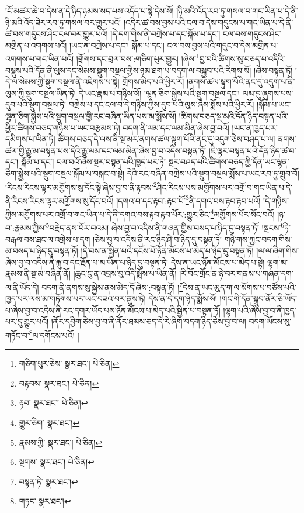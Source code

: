 །ངོ་མཚར་ཆེ་བ་དེས་ན་དེ་ཉིད་ཉམས་སད་པས་འདོད་པ་སྟེ་དེས་སོ། །ཉི་མའི་འོད་རབ་ཏུ་གསལ་བ་གང་ཡིན་པ་དེ་ནི་ཉི་མའི་འོད་ཟེར་རབ་ཏུ་གསལ་བར་གྱུར་པའོ། །འདིར་ཚ་བས་བྱས་པའི་ངལ་བ་དེས་གདུངས་པ་གང་ཡིན་པ་དེ་ནི་ཚ་བས་གདུངས་ཤིང་ངལ་བར་གྱུར་པའོ། །དེ་དག་གིས་ནི་བཀྲེས་པ་དང་སྐོམ་པ་དང་། ངལ་བས་གདུངས་ཤིང་མགྲིན་པ་འགགས་པའོ། །ཡང་ན་བཀྲེས་པ་དང་། སྐོམ་པ་དང་། ངལ་བས་བྱས་པའི་གདུང་བ་དེས་མགྲིན་པ་འགགས་པ་གང་ཡིན་པའོ། །གྲོགས་དང་བྲལ་བས་:གཅིག་པུར་གྱུར། །ཞེས་\footnote{གཅིག་པུར་ཅེས་  སྣར་ཐང་།  པེ་ཅིན། }བྱ་བའི་ཚིགས་སུ་བཅད་པ་འདིའི་བསྡུས་པའི་དོན་ནི་ལུས་དང་སེམས་སྡུག་བསྔལ་གྱིས་ཉམ་ཐག་པ་བདག་ལ་བསྐྱབ་པའི་རིགས་སོ། །ཞེས་བསྟན་ཏོ། །དེ་ལ་སེམས་ཀྱི་སྡུག་བསྔལ་ནི་འཇིགས་པ་སྟེ། གྲོགས་མེད་པའི་ཕྱིར་རོ། །ནགས་ཚལ་སྟུག་པོའི་ནང་དུ་འདུག་པ་ནི་ལུས་ཀྱི་སྡུག་བསྔལ་ཡིན་ཏེ། དེ་ཡང་རྣམ་པ་གཉིས་སོ། །ལྷན་ཅིག་སྐྱེས་པའི་སྡུག་བསྔལ་དང་། ལམ་དུ་ཞུགས་པས་དུབ་པའི་སྡུག་བསྔལ་ཏེ། བཀྲེས་པ་དང་ངལ་བ་དེ་གཉིས་ཀྱིས་དུབ་པའི་ལུས་ཞེས་སྨོས་པའི་ཕྱིར་རོ། །སྐོམ་པ་ཡང་ལྷན་ཅིག་སྐྱེས་པའི་སྡུག་བསྔལ་གྱི་རང་བཞིན་ཡིན་པས་མ་སྨོས་སོ། །ཚིགས་བཅད་སྔ་མའི་དོན་ཉིད་བསྟན་པའི་ཕྱིར་ཚིགས་བཅད་གཉིས་པ་ཡང་བརྩམས་ཏེ། བདག་ནི་ལམ་དང་ལམ་མིན་ཞེས་བྱ་བའོ། །ཡང་ན་ཁྱད་པར་དམིགས་པ་ཡིན་ཏེ། ཚིགས་བཅད་དེ་ལས་ནི་སྔ་མར་ནགས་ཚལ་སྟུག་པོའི་ནང་དུ་འདུག་ཅེས་བཤད་པ་ལ། ནགས་ཚལ་གྱི་རྒྱུ་མ་བསྟན་པས་དེའི་རྒྱུ་ལམ་དང་ལམ་མིན་ཞེས་བྱ་བ་འདིས་བསྟན་ཏོ། །ཇི་ལྟར་བསྟན་པའི་དོན་ཉིད་ཚ་བ་དང་། སྐོམ་པ་དང་། ངལ་བའོ་ཞེས་སྔར་བསྟན་པའི་ཁྱད་པར་ཏེ། སྔར་བཤད་པའི་ཚིགས་བཅད་ཀྱི་དོན་ཡང་ལྷན་ཅིག་སྐྱེས་པའི་སྡུག་བསྔལ་སྐོམ་པ་བསྐང་བ་སྟེ། དེའི་རང་བཞིན་བཀྲེས་པའི་སྡུག་བསྔལ་སྨོས་པ་ཡང་རབ་ཏུ་གྲུབ་བོ། །རིངས་རིངས་ལྟར་མགྱོགས་སུ་དོང་སྟེ་ཞེས་བྱ་བ་ནི་རྟབས་\footnote{བརྟབས་  སྣར་ཐང་།  པེ་ཅིན། }ཤིང་རིངས་པས་མགྱོགས་པར་འགྲོ་བ་གང་ཡིན་པ་དེ་ནི་རིངས་རིངས་ལྟར་མགྱོགས་སུ་དོང་བའོ། །དགའ་བ་དང་རྟབ་:རྟབ་པོ་\footnote{རྟབ་  སྣར་ཐང་།  པེ་ཅིན། }ནི་དགའ་བས་རྟབ་རྟབ་པའོ། །དེ་གཉིས་ཀྱིས་མགྱོགས་པར་འགྲོ་བ་གང་ཡིན་པ་དེ་ནི་དགའ་བས་རྟབ་རྟབ་པོར་:གྱུར་ཅིང་\footnote{གྱུར་ཅིག་  སྣར་ཐང་། }མགྱོགས་པོར་སོང་བའོ། །ཉ་བ་:རྣམས་ཀྱིས་\footnote{རྣམས་ཀྱི་  སྣར་ཐང་།  པེ་ཅིན། }བརྗེད་ནས་བོར་བའམ། ཞེས་བྱ་བ་འདིས་ནི་གཞན་གྱིས་བསད་པ་ཉིད་དུ་བསྟན་ཏོ། །སྔངས་\footnote{སྔགས་  སྣར་ཐང་།  པེ་ཅིན། }ཏེ་བརྒལ་བས་ཐང་ལ་འགྲེས་པ་དག །ཅེས་བྱ་བ་འདིས་ནི་རང་ཉིད་ཤི་བ་ཉིད་དུ་བསྟན་ཏེ། གཉི་གས་ཀྱང་བདག་གིས་མ་བསད་པ་ཉིད་དུ་བསྟན་ཏོ། །དེ་བས་ན་སྦྱིན་པའི་དངོས་པོ་ཉོན་མོངས་པ་མེད་པ་ཉིད་དུ་བསྟན་ཏོ། །ལ་ལ་ཞིག་གིས་ཞེས་བྱ་བ་འདིས་ནི་རྐུ་བ་དང་རྔོན་པ་མ་ཡིན་པ་ཉིད་དུ་བསྟན་ཏེ། དེས་ན་ཡང་ཉོན་མོངས་པ་མེད་པ་སྟེ། ལྷག་མ་རྣམས་ནི་སྔ་མ་བཞིན་ནོ། །ཆུང་ངུ་ན་འབྲས་བུ་འདི་སྨོས་པ་ཡིན་ནོ། །རི་བོང་གྲོང་ན་ཉེ་བར་གནས་པ་གཞན་དག་ལ་ནི་ཡོད་དེ། བདག་ནི་ནགས་སུ་སྐྱེས་ནས་མེད་དོ་ཞེས་:བསྟན་ཏོ། །\footnote{བསྟན་ཏེ་  སྣར་ཐང་། }དེས་ན་ཡང་མུད་ག་ལ་སོགས་པ་བཙོས་པའི་ཁྱད་པར་ལས་མ་གཏོགས་པར་ཡང་བཟའ་བར་ནུས་ཏེ། དེས་ན་དེ་དག་ཉིད་སྨོས་སོ། །གང་གི་དོན་སྒྲུབ་ནོར་ཅི་ཡོད་པ་ཞེས་བྱ་བ་འདིས་ནི་རང་དགར་ཡོད་པས་ཉོན་མོངས་པ་མེད་པའི་སྦྱིན་པ་བསྟན་ཏོ། །ལྷག་པའི་ཞེས་བྱ་བ་ནི་ཁྱད་པར་དུ་གྱུར་པའོ། །ནོར་དབྱིག་ཅེས་བྱ་བ་ནི་ནོར་ཐམས་ཅད་དེ་རེ་ཞིག་བདག་ཉིད་ཅེས་བྱ་བ་ལ། བདག་ཡོངས་སུ་གཏོང་བ་\footnote{གཏང་  སྣར་ཐང་། }ལ་དགོངས་པའོ། །

